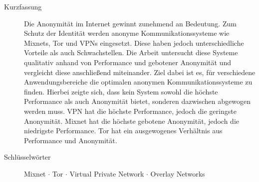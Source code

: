\begin{description}
    \item[Kurzfassung] Die Anonymität im Internet gewinnt zunehmend an Bedeutung. Zum Schutz der Identität werden anonyme Kommunikationssysteme wie Mixnets, Tor und VPNs eingesetzt. Diese haben jedoch unterschiedliche Vorteile als auch Schwachstellen. Die Arbeit untersucht diese Systeme qualitativ anhand von Performance und gebotener Anonymität und vergleicht diese anschließend miteinander. Ziel dabei ist es, für verschiedene Anwendungsbereiche die optimalen anonymen Kommunikationssysteme zu finden. Hierbei zeigte sich, dass kein System sowohl die höchste Performance als auch Anonymität bietet, sonderen dazwischen abgewogen werden muss. VPN hat die höchste Performance, jedoch die geringste Anonymität. Mixnet hat die höchste gebotene Anonymität, jedoch die niedrigste Performance. Tor hat ein ausgewogenes Verhältnis aus Performance und Anonymität.
    \item[Schlüsselwörter] Mixnet $\cdot$ Tor $\cdot$ Virtual Private Network $\cdot$ Overlay Networks
\end{description}

